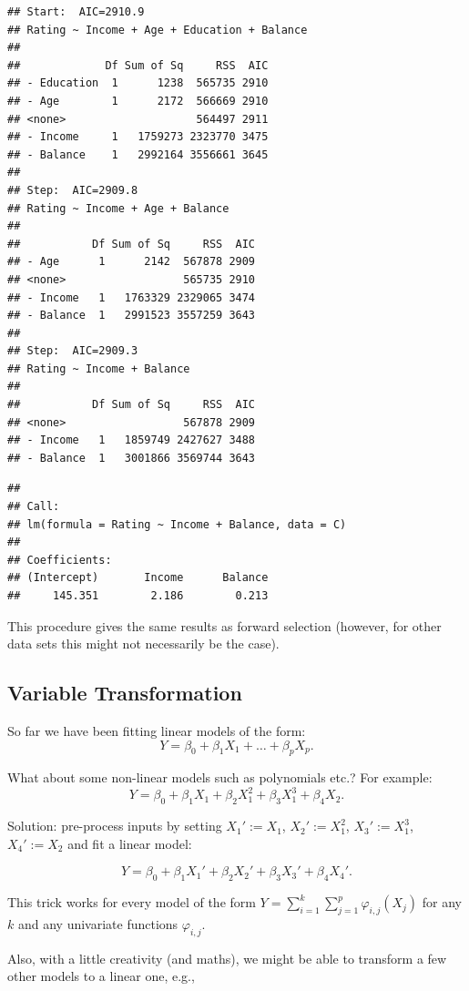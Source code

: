 \documentclass[10pt,b5paper,krantz1]{krantz}
\begin{document}
\begin{verbatim}
## Start:  AIC=2910.9
## Rating ~ Income + Age + Education + Balance
## 
##             Df Sum of Sq     RSS  AIC
## - Education  1      1238  565735 2910
## - Age        1      2172  566669 2910
## <none>                    564497 2911
## - Income     1   1759273 2323770 3475
## - Balance    1   2992164 3556661 3645
## 
## Step:  AIC=2909.8
## Rating ~ Income + Age + Balance
## 
##           Df Sum of Sq     RSS  AIC
## - Age      1      2142  567878 2909
## <none>                  565735 2910
## - Income   1   1763329 2329065 3474
## - Balance  1   2991523 3557259 3643
## 
## Step:  AIC=2909.3
## Rating ~ Income + Balance
## 
##           Df Sum of Sq     RSS  AIC
## <none>                  567878 2909
## - Income   1   1859749 2427627 3488
## - Balance  1   3001866 3569744 3643
\end{verbatim}

\begin{verbatim}
## 
## Call:
## lm(formula = Rating ~ Income + Balance, data = C)
## 
## Coefficients:
## (Intercept)       Income      Balance  
##     145.351        2.186        0.213
\end{verbatim}

This procedure gives the same results as forward selection
(however, for other data sets this might not necessarily be the case).

\hypertarget{variable-transformation}{%
\subsection{Variable Transformation}\label{variable-transformation}}

So far we have been fitting linear models of the form:
\[
Y = \beta_0 + \beta_1 X_1 + \dots + \beta_p X_p.
\]

What about some non-linear models such as polynomials etc.? For example:
\[
Y = \beta_0 + \beta_1 X_1 + \beta_2 X_1^2 + \beta_3 X_1^3 + \beta_4 X_2.
\]

Solution: pre-process inputs by setting
\(X_1' := X_1\), \(X_2' := X_1^2\), \(X_3' := X_1^3\), \(X_4' := X_2\)
and fit a linear model:

\[
Y = \beta_0 + \beta_1 X_1' + \beta_2 X_2' + \beta_3 X_3' + \beta_4 X_4'.
\]

This trick works for every model of the form
\(Y=\sum_{i=1}^k \sum_{j=1}^p \varphi_{i,j}(X_j)\) for any \(k\)
and any univariate functions \(\varphi_{i,j}\).

Also, with a little creativity (and maths), we might be able to transform
a few other models to a linear one, e.g.,
\end{document}
